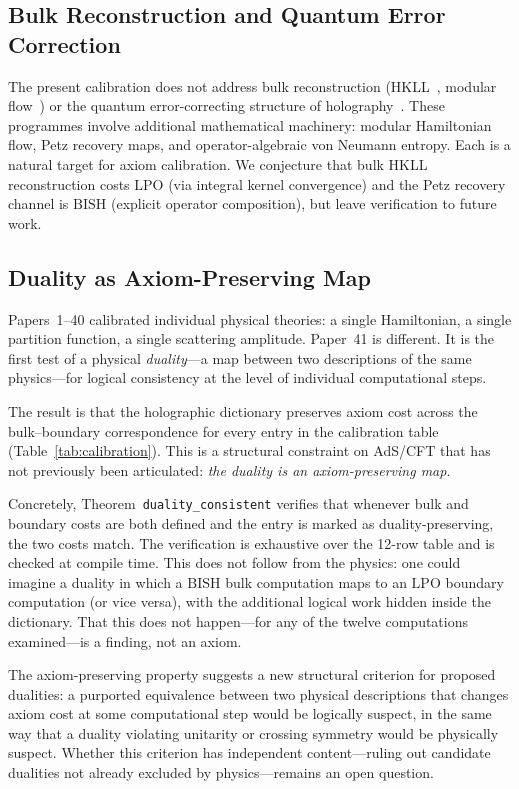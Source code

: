 \documentclass[11pt,a4paper]{article}
\theoremstyle{plain}
\theoremstyle{definition}
\newcommand{\LPO}{\ensuremath{\mathrm{LPO}}}
\newcommand{\BISH}{\ensuremath{\mathrm{BISH}}}
\begin{document}
\subsection{Bulk Reconstruction and Quantum Error Correction}

The present calibration does not address bulk reconstruction
(HKLL~\cite{ADH2015}, modular flow~\cite{JLMS2016})
or the quantum error-correcting structure of
holography~\cite{DHW2016,HP2019}.  These programmes involve
additional mathematical machinery: modular Hamiltonian flow,
Petz recovery maps, and operator-algebraic von Neumann entropy.
Each is a natural target for axiom calibration.  We conjecture
that bulk HKLL reconstruction costs $\LPO$ (via integral kernel
convergence) and the Petz recovery channel is $\BISH$ (explicit
operator composition), but leave verification to future work.

\subsection{Duality as Axiom-Preserving Map}\label{sec:duality-map}

Papers~1--40 calibrated individual physical theories: a single
Hamiltonian, a single partition function, a single scattering amplitude.
Paper~41 is different.  It is the first test of a physical
\emph{duality}---a map between two descriptions of the same
physics---for logical consistency at the level of individual
computational steps.

The result is that the holographic dictionary preserves axiom cost
across the bulk--boundary correspondence for every entry in the
calibration table (Table~\ref{tab:calibration}).  This is a structural
constraint on AdS/CFT that has not previously been articulated:
\emph{the duality is an axiom-preserving map}.

Concretely, Theorem~\texttt{duality\_consistent} verifies that
whenever bulk and boundary costs are both defined and the entry is
marked as duality-preserving, the two costs match.  The verification
is exhaustive over the 12-row table and is checked at compile time.
This does not follow from the physics: one could imagine a
duality in which a $\BISH$ bulk computation maps to an $\LPO$
boundary computation (or vice versa), with the additional logical
work hidden inside the dictionary.  That this does not happen---for
any of the twelve computations examined---is a finding, not an axiom.

The axiom-preserving property suggests a new structural criterion for
proposed dualities: a purported equivalence between two physical
descriptions that changes axiom cost at some computational step would
be logically suspect, in the same way that a duality violating
unitarity or crossing symmetry would be physically suspect.
Whether this criterion has independent content---ruling out candidate
dualities not already excluded by physics---remains an open question.
\end{document}
